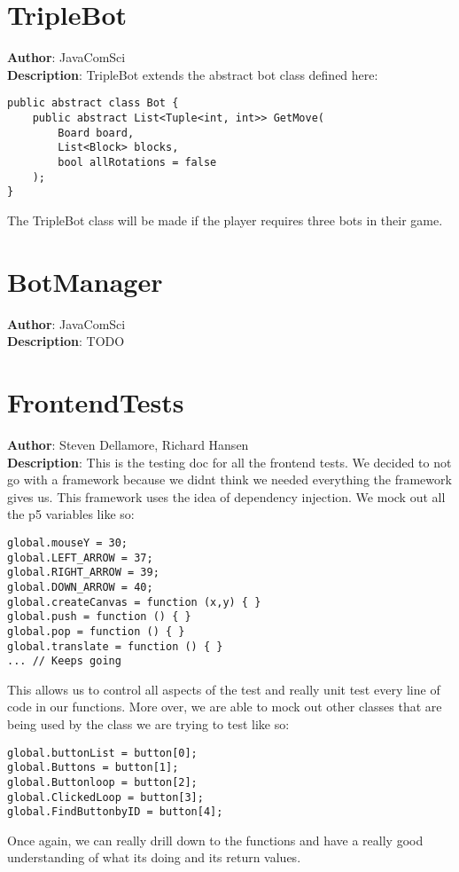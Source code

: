 \documentclass[12pt]{article}
\begin{document}
\section{TripleBot}
\textbf{Author}: JavaComSci \\
\textbf{Description}: TripleBot extends the abstract bot class defined here: 
\begin{verbatim}
public abstract class Bot {
    public abstract List<Tuple<int, int>> GetMove(
        Board board, 
        List<Block> blocks, 
        bool allRotations = false
    );
}
\end{verbatim}
 The TripleBot class will be made if the player requires three bots in their game. \\



\section{BotManager}
\textbf{Author}: JavaComSci \\
\textbf{Description}: TODO \\



\section{FrontendTests}
\textbf{Author}: Steven Dellamore, Richard Hansen \\
\textbf{Description}: This is the testing doc for all the frontend tests. We decided to not go with a framework because we didnt think we needed everything the framework gives us. This framework uses the idea of dependency injection. We mock out all the p5 variables like so: 
\begin{verbatim}
global.mouseY = 30;
global.LEFT_ARROW = 37;
global.RIGHT_ARROW = 39;
global.DOWN_ARROW = 40;
global.createCanvas = function (x,y) { }
global.push = function () { }
global.pop = function () { }
global.translate = function () { }
... // Keeps going
\end{verbatim}
 This allows us to control all aspects of the test and really unit test every line of code in our functions. More over, we are able to mock out other classes that are being used by the class we are trying to test like so: 
\begin{verbatim}
global.buttonList = button[0];
global.Buttons = button[1];
global.Buttonloop = button[2];
global.ClickedLoop = button[3];
global.FindButtonbyID = button[4];
\end{verbatim}
 Once again, we can really drill down to the functions and have a really good understanding of what its doing and its return values. \\
\end{document}
